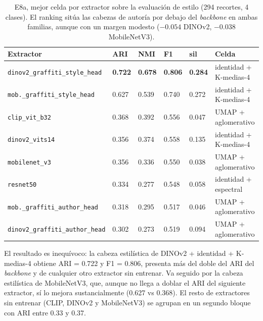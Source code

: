 \begin{table}[h]
  \centering
{\footnotesize
\begin{tabular}{|p{5.4cm}|p{1.2cm}|p{1.0cm}|p{1.0cm}|p{1.0cm}|p{3.5cm}|} \hline
  \textbf{Extractor} & \textbf{ARI} & \textbf{NMI} & \textbf{F1} & \textbf{sil} & \textbf{Celda} \\ \hline
  \texttt{dinov2\_graffiti\_style\_head}      & \textbf{0.722} & \textbf{0.678} & \textbf{0.806} & \textbf{0.284} & identidad + K-medias-4   \\ \hline
  \texttt{mob.\_graffiti\_style\_head}        & 0.627 & 0.539 & 0.740 & 0.272 & identidad + K-medias-4   \\ \hline
  \texttt{clip\_vit\_b32}                     & 0.368 & 0.392 & 0.556 & 0.047 & UMAP + aglomerativo    \\ \hline
  \texttt{dinov2\_vits14}                     & 0.356 & 0.374 & 0.558 & 0.135 & identidad + K-medias-4   \\ \hline
  \texttt{mobilenet\_v3}                      & 0.356 & 0.336 & 0.550 & 0.038 & UMAP + aglomerativo    \\ \hline
  \texttt{resnet50}                           & 0.334 & 0.277 & 0.548 & 0.058 & identidad + espectral  \\ \hline
  \texttt{mob.\_graffiti\_author\_head}       & 0.318 & 0.295 & 0.517 & 0.046 & UMAP + aglomerativo    \\ \hline
  \texttt{dinov2\_graffiti\_author\_head}     & 0.302 & 0.273 & 0.519 & 0.094 & UMAP + aglomerativo    \\ \hline
\end{tabular}
}
  \caption[E8a, mejor celda por extractor (estilo)]{E8a, mejor celda por extractor sobre la evaluación de estilo (294
  recortes, 4 clases). El ranking sitúa las cabezas de autoría por debajo del
  \textit{backbone} en ambas familias, aunque con un margen modesto
  ($-0.054$ DINOv2, $-0.038$ MobileNetV3).}
  \label{tab:e8a-best}
\end{table}

El resultado es inequívoco: la cabeza estilística de DINOv2 + identidad +
K-medias-4 obtiene ARI = 0.722 y F1 = 0.806, presenta más del doble del ARI del
\textit{backbone} y de cualquier otro extractor sin entrenar. Va seguido por la
cabeza estilística de MobileNetV3, que, aunque no llega a doblar el ARI del
siguiente extractor, sí lo mejora sustancialmente (0.627 vs 0.368). El resto de
extractores sin entrenar (CLIP, DINOv2 y MobileNetV3) se agrupan en un segundo
bloque con ARI entre 0.33 y 0.37.


